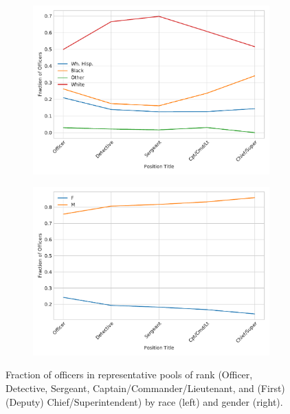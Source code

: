 \begin{figure}[t!] 
\begin{subfigure}{0.45\textwidth}
\includegraphics[width=\textwidth]{figs/position_race} 
\end{subfigure}
\begin{subfigure}{0.45\textwidth}
\includegraphics[width=\textwidth]{figs/position_gender} 
\end{subfigure}
\caption{Fraction of officers in representative pools of rank (Officer, Detective, Sergeant, Captain/Commander/Lieutenant, and (First) (Deputy) Chief/Superintendent)
 by race (left) and gender (right).} \label{fig:position}
\end{figure}

